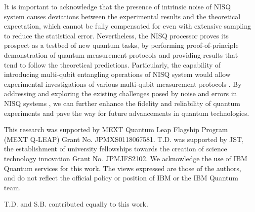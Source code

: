 \documentclass[%
reprint,
superscriptaddress,
 amsmath,amssymb,
 aps,
pra,
]{revtex4-2}
\begin{document}
It is important to acknowledge that the presence of intrinsic noise of NISQ system causes deviations between the experimental results and the theoretical expectation, which cannot be fully compensated for even with extensive sampling to reduce the statistical error. 
Nevertheless, the NISQ processor proves its prospect as a testbed of new quantum tasks, by performing proof-of-principle demonstration of quantum measurement protocols and providing results that tend to follow the theoretical predictions.
Particularly, the capability of introducing multi-qubit entangling operations of NISQ system would allow experimental investigations of various multi-qubit measurement protocols \cite{edamatsu2016complete, Vidil_2021, 10.1038/s41534-023-00688-7}.
By addressing and exploring the existing challenges posed by noise and errors in NISQ systems \cite{PhysRevA.100.052315, PhysRevA.103.042603}, we can further enhance the fidelity and reliability of quantum experiments and pave the way for future advancements in quantum technologies.

\begin{acknowledgments}
This research was supported by MEXT Quantum Leap Flagship Program (MEXT Q-LEAP) Grant No. JPMXS0118067581. 
T.D. was supported by JST, the establishment of university fellowships towards the creation of science technology innovation Grant No. JPMJFS2102.
We acknowledge the use of IBM Quantum services for this work. 
The views expressed are those of the authors, and do not reflect the official policy or position of IBM or the IBM Quantum team.

T.D. and S.B. contributed equally to this work.
\end{acknowledgments}


\end{document}
